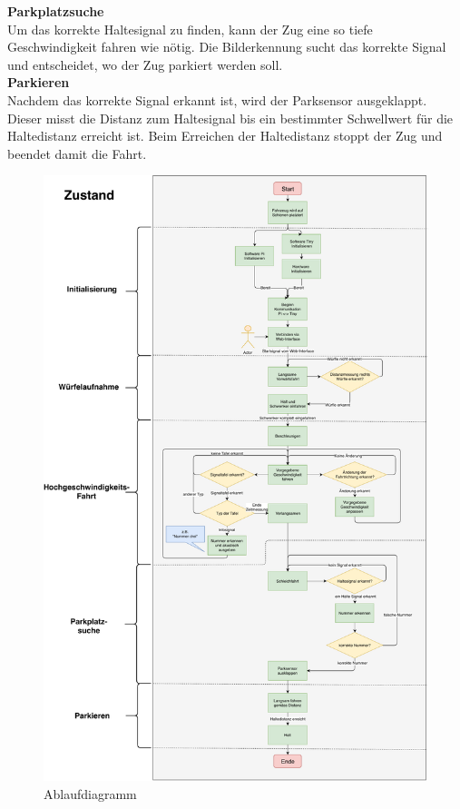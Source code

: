 \documentclass[../../main.tex]{subfiles}
\begin{document}
    \textbf{Parkplatzsuche}\\
    Um das korrekte Haltesignal zu finden, kann der Zug eine so tiefe Geschwindigkeit fahren wie nötig. Die Bilderkennung sucht das korrekte Signal und entscheidet, wo der Zug parkiert werden soll.\\

    \textbf{Parkieren}\\
    Nachdem das korrekte Signal erkannt ist, wird der Parksensor ausgeklappt. Dieser misst die Distanz zum Haltesignal bis ein bestimmter Schwellwert für die Haltedistanz erreicht ist. Beim Erreichen der Haltedistanz stoppt der Zug und beendet damit die Fahrt.

    \begin{figure}[H]
        \centering
        \includegraphics[width=1.0\textwidth]{Ablaufdiagramm.pdf}
        \caption {Ablaufdiagramm}
        \label{fig:Ablaufdiagramm}
    \end{figure}

    
\end{document}
